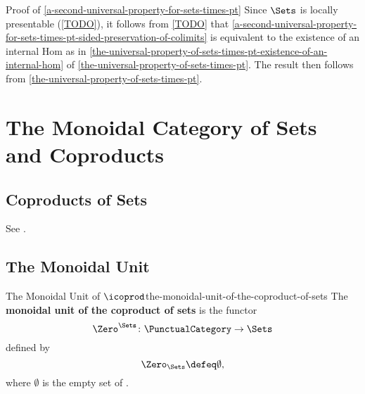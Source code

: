 \begin{Proof}{Proof of \cref{a-second-universal-property-for-sets-times-pt}}%
    Since $\Sets$ is locally presentable (\cref{TODO}), it follows from \cref{TODO} that \cref{a-second-universal-property-for-sets-times-pt-sided-preservation-of-colimits} is equivalent to the existence of an internal Hom as in \cref{the-universal-property-of-sets-times-pt-existence-of-an-internal-hom} of \cref{the-universal-property-of-sets-times-pt}. The result then follows from \cref{the-universal-property-of-sets-times-pt}.
\end{Proof}
\section{The Monoidal Category of Sets and Coproducts}\label{section-the-monoidal-category-of-sets-and-coproducts}
\subsection{Coproducts of Sets}\label{subsection-the-monoidal-category-of-sets-and-coproducts-coproducts-of-sets}
See .
\subsection{The Monoidal Unit}\label{subsection-the-monoidal-category-of-sets-and-coproducts-the-monoidal-unit-of-the-coproduct-of-sets}
\begin{definition}{The Monoidal Unit of $\icoprod$}{the-monoidal-unit-of-the-coproduct-of-sets}%
    The \textbf{monoidal unit of the coproduct of sets} is the functor
    \[
        \Zero^{\Sets}
        \colon
        \PunctualCategory
        \to
        \Sets
    \]
    defined by
    \[
        \Zero_{\Sets}%
        \defeq%
        \emptyset,
    \]%
    where $\emptyset$ is the empty set of .
\end{definition}

